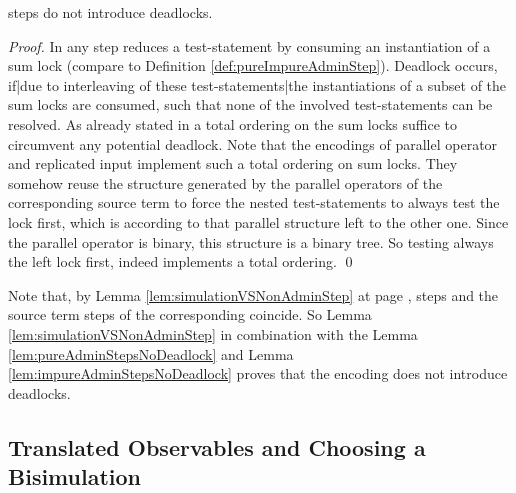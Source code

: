 \documentclass[]{llncs}
\begin{document}
\begin{lemma} \label{lem:impureAdminStepsNoDeadlock}
	\Impure \admin steps do not introduce deadlocks.
\end{lemma}

\begin{proof}
	In  any \impure \admin step reduces a test-statement by consuming an instantiation of a sum lock (compare to Definition \ref{def:pureImpureAdminStep}). Deadlock occurs, if|due to interleaving of these test-statements|the instantiations of a subset of the sum locks are consumed, such that none of the involved test-statements can be resolved. As already stated in \cite{nestmann00} a total ordering on the sum locks suffice to circumvent any potential deadlock. Note that the encodings of parallel operator and replicated input implement such a total ordering on sum locks. They somehow reuse the structure generated by the parallel operators of the corresponding source term to force the nested test-statements to always test the lock first, which is according to that parallel structure left to the other one. Since the parallel operator is binary, this structure is a binary tree. So testing always the left lock first, indeed implements a total ordering.
	\qed
\end{proof}

Note that, by Lemma \ref{lem:simulationVSNonAdminStep} at page \pageref{lem:simulationVSNonAdminStep}, \nonAdmin steps and the source term steps of the corresponding \simulations coincide. So Lemma \ref{lem:simulationVSNonAdminStep} in combination with the Lemma \ref{lem:pureAdminStepsNoDeadlock} and Lemma \ref{lem:impureAdminStepsNoDeadlock} proves that the encoding  does not introduce deadlocks.

\subsection{Translated Observables and Choosing a Bisimulation} \label{sec:transBarbBisim}
\end{document}
